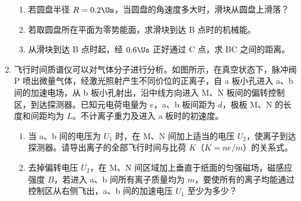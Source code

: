 \documentclass[\gkver]{gaokaozhenti}
\begin{document}
\begin{enumerate}
\begin{enumerate}
	\item
	若圆盘半径 $R=0.2\Um$，当圆盘的角速度多大时，滑块从圆盘上滑落？
	\item
	若取圆盘所在平面为零势能面，求滑块到达 B 点时的机械能。
	\item
	从滑块到达 B 点时起，经 $0.6\Us$ 正好通过 C 点，求 BC 之间的距离。
\end{enumerate}


\jdanswer{
\begin{enumerate}
	\item
	$5\Urads$
	\item
	$-4\UJ$
	\item
	$0.76\Um$
\end{enumerate}
}


\item
飞行时间质谱仪可以对气体分子进行分析。如图所示，在真空状态下，脉冲阀 P 喷出微量气体，经激光照射产生不同价位的正离子，自 a 板小孔进入 a、b 间的加速电场，从 b 板小孔射出，沿中线方向进入 M、N 板间的偏转控制区，到达探测器。已知元电荷电量为 $e$，a、b 板间距为 $d$，极板 M、N 的长度和间距均为 $L$。不计离子重力及进入 a 板时的初速度。

\begin{enumerate}
	\item
	当 a、b 间的电压为 $U_{1}$ 时，在 M、N 间加上适当的电压 $U_{2}$，使离子到达探测器。请导出离子的全部飞行时间与比荷 $K$（$K=ne/m$）的关系式。
	\item
	去掉偏转电压 $U_{2}$，在 M、N 间区域加上垂直于纸面的匀强磁场，磁感应强度 $B$，若进入 a、b 间所有离子质量均为 $m$，要使所有的离子均能通过控制区从右侧飞出，a、b 间的加速电压 $U_{1}$ 至少为多少？
\end{enumerate}


\end{enumerate}
\end{document}
